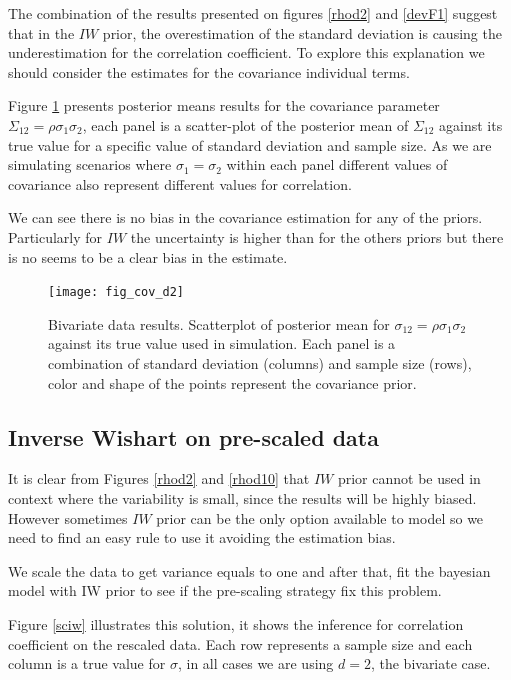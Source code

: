 \documentclass{article}
\begin{document}
The combination of the results presented on figures \ref{rhod2} and \ref{devF1}  suggest that in the $IW$ prior, the overestimation of the standard deviation is causing the underestimation for the correlation coefficient. To explore this explanation we should consider the estimates for the covariance individual terms. 

Figure \ref{devCov} presents posterior means results for the covariance parameter $\Sigma_{12}=\rho\sigma_1\sigma_2$, each panel is a scatter-plot of the posterior mean of $\Sigma_{12}$ against its true value for a specific value of standard deviation and sample size. As we are simulating scenarios where $\sigma_1 = \sigma_2$ within each panel different values of covariance also represent different values for correlation. 

We can see there is no bias in the covariance estimation for any of the priors. Particularly for $IW$ the uncertainty is higher than for the others priors but there is no seems to be a clear bias in the estimate. 
\begin{figure}[htbp]
   \centering
   \texttt{[image: fig\_cov\_d2]} 
    \vspace{-.5in}
   \caption{Bivariate data results. Scatterplot of posterior mean for $\sigma_{12}=\rho\sigma_1\sigma_2$  against its true value used in simulation. Each panel is a combination of standard deviation (columns) and sample size (rows),  color and shape of the points represent the covariance prior. \label{devCov} }
\end{figure}

\subsection{Inverse Wishart on pre-scaled data}

It is clear from Figures \ref{rhod2} and \ref{rhod10} that $IW$ prior cannot be used in context where the variability is small, since the results will be highly biased. However sometimes $IW$ prior can be the only option available to model so we need to find an easy rule to use it avoiding the estimation bias. 

We scale the data to get variance equals to one and after that, fit the bayesian model with IW prior to see if the pre-scaling strategy fix this problem. 

Figure \ref{sciw} illustrates this solution, it shows the inference for correlation coefficient on the rescaled data. Each row represents a sample size and each column is a true value for $\sigma$, in all cases we are using $d=2$, the bivariate case. 
\end{document}
